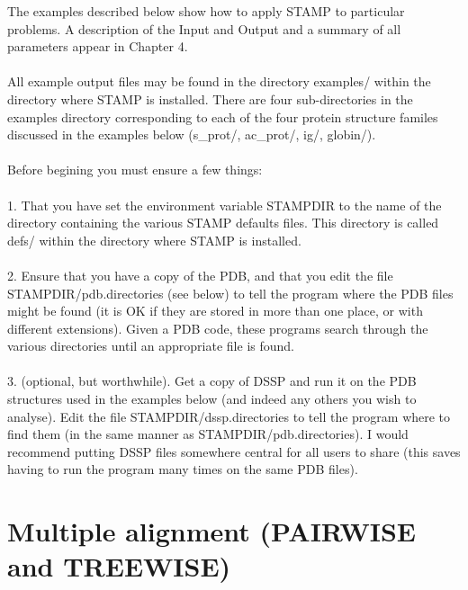 The examples described below show how to apply STAMP to particular 
problems.  A description of the Input and Output and a summary
of all parameters appear in Chapter 4.\\
\\
All example output files may be found in the directory examples/ 
within the directory where STAMP is installed.   There are four sub-directories
in the examples directory corresponding to each of the four protein
structure familes discussed in the examples below (s\_prot/, ac\_prot/, ig/, globin/).\\
\\
Before begining you must ensure a few things:\\
\\
1. That you have set the environment variable STAMPDIR to the name of the 
directory containing the various STAMP defaults files.  This directory is
called defs/ within the directory where STAMP is installed. \\
\\
2. Ensure that you have a copy of the PDB, and that you edit the file
STAMPDIR/pdb.directories (see below) to tell the program where the PDB 
files might be found (it is OK if they are stored in more than one place, 
or with different extensions).   Given a PDB code, these programs search 
through the various directories until an appropriate file is found.\\
\\
3. (optional, but worthwhile).  Get a copy of DSSP and run it on the PDB
structures used in the examples below (and indeed any others you wish to analyse). 
Edit the file STAMPDIR/dssp.directories to tell the program where to find them (in the 
same manner as STAMPDIR/pdb.directories).  I would recommend putting DSSP files
somewhere central for all users to share (this saves having to run the program many
times on the same PDB files).

\section{Multiple alignment (PAIRWISE and TREEWISE)}

